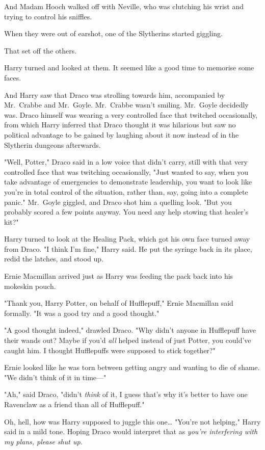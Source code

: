And Madam Hooch walked off with Neville, who was clutching his wrist and trying 
to control his sniffles.

When they were out of earshot, one of the Slytherins started giggling.

That set off the others.

Harry turned and looked at them. It seemed like a good time to memorise some 
faces.

And Harry saw that Draco was strolling towards him, accompanied by Mr.~Crabbe 
and Mr.~Goyle. Mr.~Crabbe wasn't smiling. Mr.~Goyle decidedly was. Draco 
himself was wearing a very controlled face that twitched occasionally, from 
which Harry inferred that Draco thought it was hilarious but saw no political 
advantage to be gained by laughing about it now instead of in the Slytherin 
dungeons afterwards.

"Well, Potter," Draco said in a low voice that didn't carry, still with that 
very controlled face that was twitching occasionally, "Just wanted to say, when 
you take advantage of emergencies to demonstrate leadership, you want to look 
like you're in total control of the situation, rather than, say, going into a 
complete panic." Mr.~Goyle giggled, and Draco shot him a quelling look. "But 
you probably scored a few points anyway. You need any help stowing that 
healer's kit?"

Harry turned to look at the Healing Pack, which got his own face turned away 
from Draco. "I think I'm fine," Harry said. He put the syringe back in its 
place, redid the latches, and stood up.

Ernie Macmillan arrived just as Harry was feeding the pack back into his 
mokeskin pouch.

"Thank you, Harry Potter, on behalf of Hufflepuff," Ernie Macmillan said 
formally. "It was a good try and a good thought."

"A good thought indeed," drawled Draco. "Why didn't anyone in Hufflepuff have 
their wands out? Maybe if you'd \emph{all} helped instead of just Potter, you 
could've caught him. I thought Hufflepuffs were supposed to stick together?"

Ernie looked like he was torn between getting angry and wanting to die of 
shame. "We didn't think of it in time---"

"Ah," said Draco, "didn't \emph{think} of it, I guess that's why it's better to 
have one Ravenclaw as a friend than all of Hufflepuff."

Oh, hell, how was Harry supposed to juggle this one{\ldots} "You're not 
helping," Harry said in a mild tone. Hoping Draco would interpret that as 
\emph{you're interfering with my plans, please shut up.}

